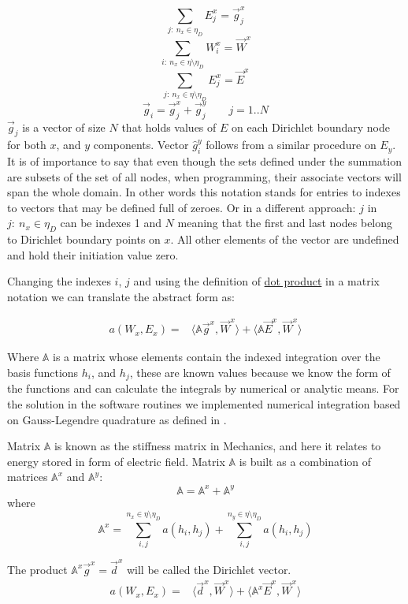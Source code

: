 \[\sum_{j:\ n_x \in \eta_D}E_j^x = \vec{g}_j^x \]
\[\sum_{i:\ n_x \in \eta\setminus\eta_D}W_i^x = \vec{W}^x \]
\[\sum_{j:\ n_x \in \eta\setminus\eta_D}E_j^x = \vec{E}^x \]
\[\vec{g}_i = \vec{g}_j^x+\vec{g}_j^y \qquad j = 1.. N \]
$\vec{g}_j$ is a vector of size $N$ that holds values of $E$ on each Dirichlet boundary node for both $x$, and $y$ components. Vector $\hat{g}_i^y$ follows from a similar procedure on $E_y$. It is of importance to say that even though the sets defined under the summation are subsets of the set of all nodes, when programming, their associate vectors will span the whole domain. In other words this notation stands for entries to indexes to vectors that may be defined full of zeroes. Or in a different approach: $j$ in $j:\ n_x \in \eta_D$ can be indexes 1 and $N$ meaning that the first and last nodes belong to Dirichlet boundary points on $x$. All other elements of the vector are undefined and hold their initiation value zero.


Changing the indexes $i$, $j$ and using the definition of \href{http://en.wikipedia.org/wiki/Dot_product}{dot product} in a matrix notation we can translate the abstract form as:

\begin{align*}
a\left(W_x,E_x\right)=&\langle \mathbb{A}\vec{g}^x,\vec{W}^x\rangle
+\langle\mathbb{A}\vec{E}^x,\vec{W}^x\rangle  
\end{align*}

Where $\mathbb{A}$ is a matrix whose elements contain the indexed integration over the basis functions $h_i$, and $h_j$, these are known values because we know the form of the functions and can calculate the integrals by numerical or analytic means. For the solution in the software routines we implemented numerical integration based on Gauss-Legendre quadrature as defined in \cite{Bathe1996}. 

Matrix $\mathbb{A}$ is known as the stiffness matrix in Mechanics, and here it relates to energy stored in form of electric field. Matrix $\mathbb{A}$ is built as a combination of matrices $\mathbb{A}^x$ and $\mathbb{A}^y$:
\[\mathbb{A} = \mathbb{A}^x+\mathbb{A}^y\]
where
\[\mathbb{A}^x = \sum_{i,j}^{n_x \in \eta\setminus\eta_D} a(h_i,h_j)+\sum_{i,j}^{n_y \in \eta\setminus\eta_D} a(h_i,h_j)\]

The product $\mathbb{A}^x\vec{g}^x = \vec{d}^x$ will be called the Dirichlet vector.
\begin{align}
a\left(W_x,E_x\right)=&\langle \vec{d}^x,\vec{W}^x\rangle
+\langle\mathbb{A}^x\vec{E}^x,\vec{W}^x\rangle \label{eq:potential_discrete} 
\end{align}

